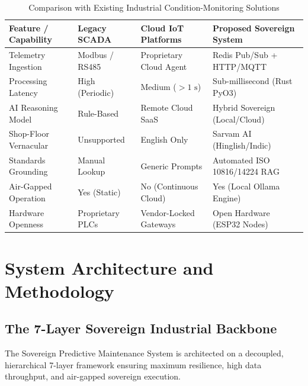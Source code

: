 \documentclass[12pt,a4paper,oneside]{report}
\begin{document}
\begin{table}[H]
\centering
\caption{Comparison with Existing Industrial Condition-Monitoring Solutions}
\label{tab:comparison}
\footnotesize
\begin{tabularx}{\textwidth}{p{32mm}p{28mm}p{35mm}X}
\toprule
\textbf{Feature / Capability} & \textbf{Legacy SCADA} & \textbf{Cloud IoT Platforms} & \textbf{Proposed Sovereign System} \\
\midrule
Telemetry Ingestion & Modbus / RS485 & Proprietary Cloud Agent & Redis Pub/Sub + HTTP/MQTT \\
Processing Latency & High (Periodic) & Medium ($>1\text{ s}$) & Sub-millisecond (Rust PyO3) \\
AI Reasoning Model & Rule-Based & Remote Cloud SaaS & Hybrid Sovereign (Local/Cloud) \\
Shop-Floor Vernacular & Unsupported & English Only & Sarvam AI (Hinglish/Indic) \\
Standards Grounding & Manual Lookup & Generic Prompts & Automated ISO 10816/14224 RAG \\
Air-Gapped Operation & Yes (Static) & No (Continuous Cloud) & Yes (Local Ollama Engine) \\
Hardware Openness & Proprietary PLCs & Vendor-Locked Gateways & Open Hardware (ESP32 Nodes) \\
\bottomrule
\end{tabularx}
\end{table}

\newpage
\chapter{System Architecture and Methodology}

\section{The 7-Layer Sovereign Industrial Backbone}
The Sovereign Predictive Maintenance System is architected on a decoupled, hierarchical 7-layer framework ensuring maximum resilience, high data throughput, and air-gapped sovereign execution.
\end{document}
